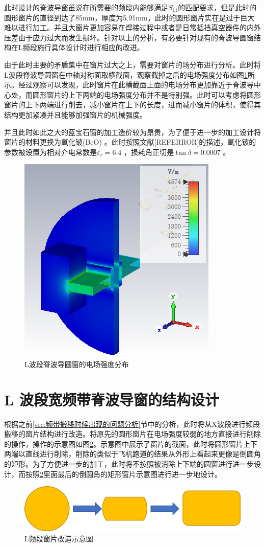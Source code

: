 \documentclass[master]{thesis-uestc}
\begin{document}
此时设计的脊波导窗虽说在所需要的频段内能够满足$S_{11}$的匹配要求，但是此时的圆形窗片的直径到达了85mm，厚度为5.91mm，此时的圆形窗片实在是过于巨大难以进行加工。并且大窗片更加容易在焊接过程中或者是日常抵挡真空器件的内外压差由于应力过大而发生损坏。针对以上的分析，有必要针对现有的脊波导圆窗结构在L频段施行具体设计时进行相应的改进。

由于此时主要的矛盾集中在窗片过大之上，需要对窗片的场分布进行分析。此时将L波段脊波导圆窗在中轴对称面取横截面，观察截掉之后的电场强度分布如图\ref{fig:L波段脊波导圆窗的电场强度分布}所示。经过观察可以发现，此时窗片在此横截面上面的电场分布更加靠近于脊波导中心处，而圆形窗片的上下两端的电场强度分布并不是特别强。此时可以考虑将圆形窗片的上下两端进行削去，减小窗片在上下的长度，进而减小窗片的体积，使得其结构更加紧凑并且能够加强窗片的机械强度。

并且此时如此之大的蓝宝石窗的加工造价较为昂贵，为了便于进一步的加工设计将窗片的材料更换为氧化铍(BeO) 。此时按照文献[REFERROR]的描述，氧化铍的参数被设置为相对介电常数是$\varepsilon_r = 6.4$ ，损耗角正切是$\tan \delta = 0.0007$ 。

\begin{figure}[!htb]
    \centering
    \includegraphics[width=0.35\linewidth]{pic/chapter4/L波段脊波导圆窗的电场强度分布.png}
    \caption{L波段脊波导圆窗的电场强度分布}
    \label{fig:L波段脊波导圆窗的电场强度分布}
\end{figure}

\section{L 波段宽频带脊波导窗的结构设计}
根据之前\ref{sec:频带搬移时候出现的问题分析}节中的分析，此时将从X波段进行频段搬移的窗片结构进行改造。将原先的圆形窗片在电场强度较弱的地方直接进行削除的操作，操作的示意图如图\ref{fig:L频段改造}。示意图中展示了窗片的截面，此时将圆形窗片上下两端以直线进行削除，削除的类似于飞机跑道的结果从外形上看起来更像是倒圆角的矩形。为了方便进一步的加工，此时将不按照被消除上下端的圆窗进行进一步设计，而按照\ref{fig:L频段改造}里面最后的倒圆角的矩形窗片示意图进行进一步地设计。
\begin{figure}[!htb]
    \centering
    \includegraphics[width=0.5\linewidth]{pic/chapter4/L脊波导窗片改造.png}
    \caption{L频段窗片改造示意图}
    \label{fig:L频段改造}
\end{figure}
\end{document}
